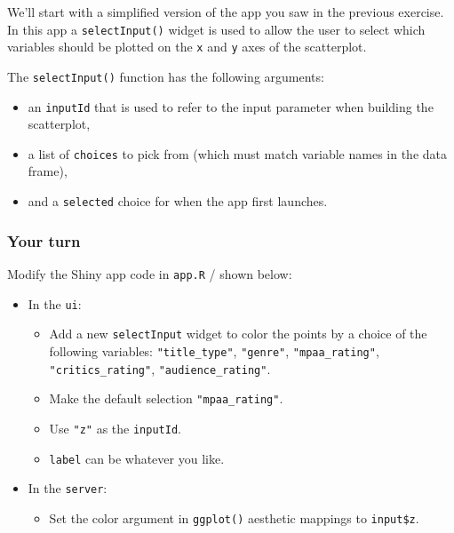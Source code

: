 \documentclass[
  letterpaper,
  DIV=11,
  numbers=noendperiod]{scrreprt}
\providecommand{\tightlist}{%
  \setlength{\itemsep}{0pt}\setlength{\parskip}{0pt}}
\begin{document}
We'll start with a simplified version of the app you saw in the previous
exercise. In this app a \texttt{selectInput()} widget is used to allow
the user to select which variables should be plotted on the \texttt{x}
and \texttt{y} axes of the scatterplot.

The \texttt{selectInput()} function has the following arguments:

\begin{itemize}
\tightlist
\item
  an \texttt{inputId} that is used to refer to the input parameter when
  building the scatterplot,
\item
  a list of \texttt{choices} to pick from (which must match variable
  names in the data frame),
\item
  and a \texttt{selected} choice for when the app first launches.
\end{itemize}

\hypertarget{your-turn-1}{%
\subsubsection{Your turn}\label{your-turn-1}}

Modify the Shiny app code in \texttt{app.R} / shown below:

\begin{itemize}
\tightlist
\item
  In the \texttt{ui}:

  \begin{itemize}
  \tightlist
  \item
    Add a new \texttt{selectInput} widget to color the points by a
    choice of the following variables: \texttt{"title\_type"},
    \texttt{"genre"}, \texttt{"mpaa\_rating"},
    \texttt{"critics\_rating"}, \texttt{"audience\_rating"}.
  \item
    Make the default selection \texttt{"mpaa\_rating"}.
  \item
    Use \texttt{"z"} as the \texttt{inputId}.
  \item
    \texttt{label} can be whatever you like.
  \end{itemize}
\item
  In the \texttt{server}:

  \begin{itemize}
  \tightlist
  \item
    Set the color argument in \texttt{ggplot()} aesthetic mappings to
    \texttt{input\$z}.
  \end{itemize}
\end{itemize}
\end{document}
